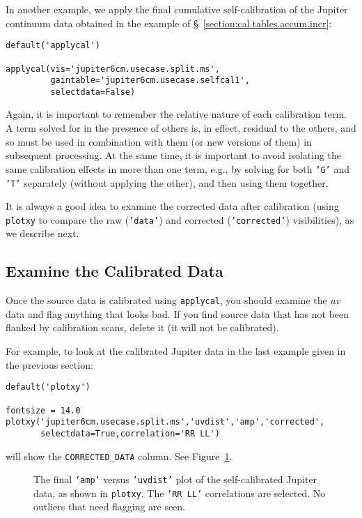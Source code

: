 In another example, we apply the final cumulative self-calibration 
of the Jupiter continuum data obtained in the example of
\S~\ref{section:cal.tables.accum.incr}:
\small
\begin{verbatim}
default('applycal')

applycal(vis='jupiter6cm.usecase.split.ms',
         gaintable='jupiter6cm.usecase.selfcal1',
         selectdata=False)
\end{verbatim}
\normalsize

Again, it is important to remember the relative nature of each calibration
term.  A term solved for in the presence of others is, in effect,
residual to the others, and so must be used in combination with them
(or new versions of them) in subsequent processing.  At the same time,
it is important to avoid isolating the same calibration effects in
more than one term, e.g., by solving for both {\tt 'G'} and {\tt 'T'} 
separately (without applying the other), and then using them together.  

It is always a good idea to examine the corrected data after calibration
(using {\tt plotxy} to compare the raw ({\tt 'data'}) and corrected 
({\tt 'corrected'}) visibilities), as we describe next.

\subsection{Examine the Calibrated Data}
\label{section:cal.correct.exam}

Once the source data is calibrated using {\tt applycal}, 
you should examine the $uv$ data and flag anything that looks bad.  If
you find source data that has not been flanked by calibration scans,
delete it (it will not be calibrated).  

For example, to look at the calibrated Jupiter data in the last
example given in the previous section:
\small
\begin{verbatim}
default('plotxy')

fontsize = 14.0
plotxy('jupiter6cm.usecase.split.ms','uvdist','amp','corrected',
       selectdata=True,correlation='RR LL')
\end{verbatim}
\normalsize
will show the {\tt CORRECTED\_DATA} column.  See 
Figure~\ref{fig:applycal_jupiter}.

\begin{figure}[h!]
\begin{center}
\caption{\label{fig:applycal_jupiter} The final {\tt 'amp'} versus
{\tt 'uvdist'} plot of the self-calibrated Jupiter data, as shown
in {\tt plotxy}.  The {\tt 'RR LL'} correlations are selected.
No outliers that need flagging are seen. }
\hrulefill
\end{center}
\end{figure}

